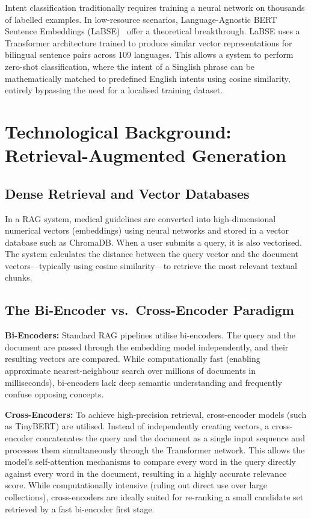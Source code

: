 \documentclass[12pt,a4paper]{report}
\begin{document}
Intent classification traditionally requires training a neural network on thousands of labelled examples. In low-resource scenarios, Language-Agnostic BERT Sentence Embeddings (LaBSE)~\cite{Feng2022} offer a theoretical breakthrough. LaBSE uses a Transformer architecture trained to produce similar vector representations for bilingual sentence pairs across 109 languages. This allows a system to perform zero-shot classification, where the intent of a Singlish phrase can be mathematically matched to predefined English intents using cosine similarity, entirely bypassing the need for a localised training dataset.

\section{Technological Background: Retrieval-Augmented Generation}

\subsection{Dense Retrieval and Vector Databases}

In a RAG system, medical guidelines are converted into high-dimensional numerical vectors (embeddings) using neural networks and stored in a vector database such as ChromaDB. When a user submits a query, it is also vectorised. The system calculates the distance between the query vector and the document vectors---typically using cosine similarity---to retrieve the most relevant textual chunks.

\subsection{The Bi-Encoder vs.\ Cross-Encoder Paradigm}

\textbf{Bi-Encoders:} Standard RAG pipelines utilise bi-encoders. The query and the document are passed through the embedding model independently, and their resulting vectors are compared. While computationally fast (enabling approximate nearest-neighbour search over millions of documents in milliseconds), bi-encoders lack deep semantic understanding and frequently confuse opposing concepts.

\textbf{Cross-Encoders:} To achieve high-precision retrieval, cross-encoder models (such as TinyBERT) are utilised. Instead of independently creating vectors, a cross-encoder concatenates the query and the document as a single input sequence and processes them simultaneously through the Transformer network. This allows the model's self-attention mechanisms to compare every word in the query directly against every word in the document, resulting in a highly accurate relevance score. While computationally intensive (ruling out direct use over large collections), cross-encoders are ideally suited for re-ranking a small candidate set retrieved by a fast bi-encoder first stage.
\end{document}
